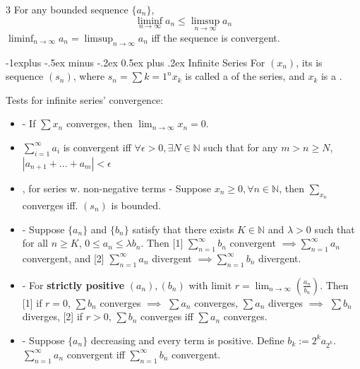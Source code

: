 \documentclass[10pt,landscape,letterpaper]{article}
\makeatletter
\renewcommand{\subsection}{\@startsection{subsection}{2}{0mm}%
                                {-1explus -.5ex minus -.2ex}%
                                {0.5ex plus .2ex}%
                                {\sffamily\normalsize\itshape}}
\makeatother
\begin{document}
\begin{multicols}{3}
 For any bounded sequence $\{a_n\}$,
\[
\liminf_{n\rightarrow\infty} a_n \leq \limsup_{n\rightarrow\infty} a_n
\]
$\liminf_{n\rightarrow\infty} a_n = \limsup_{n\rightarrow\infty} a_n$ iff the sequence is convergent.

\subsection{Infinite Series}
For $(x_n)$, its  is sequence $(s_n)$, where $s_n = \sum{k=1}^n x_k$ is called a  of the series, and $x_k$ is a .

Tests for infinite series' convergence:
\begin{itemize}
    \item {} - If $\sum x_n$ converges, then $\lim_{n\to\infty} x_n = 0$.
    
    \item {} $\sum_{i=1}^\infty a_i$ is convergent iff $\forall \epsilon > 0, \exists N\in\mathbb{N}$ such that for any $m > n \geq N$, $|a_{n+1}+...+a_m|<\epsilon$
    
    \item {}, for series w. non-negative terms - Suppose $x_n \ge 0, \forall n \in \mathbb{N}$, then $\sum_{x_n}$ converges iff. $(s_n)$ is bounded.
    
    \item {} - Suppose $\{a_n\}$ and $\{b_n\}$ satisfy that there exists $K\in\mathbb{N}$ and $\lambda>0$ such that for all $n\geq K$, $0\leq a_n \leq \lambda b_n$. Then [1] $\sum_{n=1}^\infty b_n$ convergent $\implies \sum_{n=1}^\infty a_n$ convergent, and [2] $\sum_{n=1}^\infty a_n$ divergent $\implies \sum_{n=1}^\infty b_n$ divergent.
    
    \item {} - For \textbf{strictly positive} $(a_n), (b_n)$ with limit $r = \lim_{n \to \infty} (\frac{a_n}{b_n})$. Then [1] if $r = 0$, $\sum b_n$ converges $\implies$ $\sum a_n$ converges, $\sum a_n$ diverges $\implies$ $\sum b_n$ diverges, [2] if $r > 0$, $\sum b_n$ converges iff $\sum a_n$ converges.

    \item {} - Suppose $\{a_n\}$ decreasing and every term is positive. Define $b_k:=2^ka_{2^k}$. $\sum_{n=1}^\infty a_n$ convergent iff $\sum_{n=1}^\infty b_n$ convergent.


\end{itemize}
\end{multicols}
\end{document}
